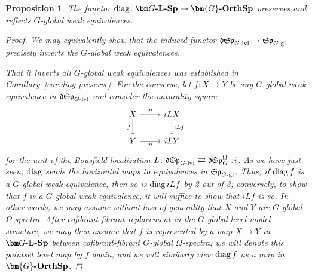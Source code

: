 \documentclass[reqno]{memo-l}
\theoremstyle{mythm}
\newtheorem{prop}[thm]{Proposition}
\theoremstyle{definition}
\numberwithin{equation}{section}
\newcommand{\cat}[1]{\textbf{\textup{#1}}}
\newcommand{\diag}{\textup{diag}}
\newcommand\noloc{%
	\nobreak
	\mspace{6mu plus 1mu}
	{:}
	\nonscript\mkern-\thinmuskip
	\mathpunct{}
	\mspace{2mu}
}
\newcommand{\mySp}{{\mathfrak S\kern-.5pt\mathfrak p}}
\newcommand{\myLSp}{{\mathfrak d\kern-.25pt}\mySp}
\newcommand{\Gosp}[1]{\cat{$\bm{#1}$-OrthSp}}
\begin{document}
\begin{prop}\label{prop:he-preserve-but-he-also-reflec}
    The functor $\diag\colon\cat{$\bm G$-$\cat{L}$-Sp}\to\Gosp{G}$ preserves and reflects $G$-global weak equivalences.
    \begin{proof}
        We may equivalently show that the induced functor $\myLSp_\text{$G$-lvl}\to\mySp_\text{$G$-gl}$ precisely inverts the $G$-global weak equivalences.
       
        That it inverts all $G$-global weak equivalences was established in Corollary~\ref{cor:diag-preserve}. For the converse, let $f\colon X\to Y$ be any $G$-global weak equivalence in $\myLSp_\text{$G$-lvl}$ and consider the naturality square
        \[
            \begin{tikzcd}
                X\arrow[d,"f"']\arrow[r,"\eta"] & iLX\arrow[d,"iLf"]\\
                Y\arrow[r,"\eta"'] & iLY
            \end{tikzcd}
        \]
        for the unit of the Bousfield localization $L\colon\myLSp_\text{$G$-lvl}\rightleftarrows\myLSp_\text{$G$}^\Omega\noloc i$. As we have just seen, $\diag$ sends the horizontal maps to equivalences in $\mySp_\text{$G$-gl}$. Thus, if $\diag\,f$ is a $G$-global weak equivalence, then so is $\diag\,iLf$ by 2-out-of-3; conversely, to show that $f$ is a $G$-global weak equivalence, it will suffice to show that $iLf$ is so. In other words, we may assume without loss of generality that $X$ and $Y$ are $G$-global $\Omega$-spectra. After cofibrant-fibrant replacement in the $G$-global level model structure, we may then assume that $f$ is represented by a map $X\to Y$ in $\cat{$\bm G$-$\cat{L}$-Sp}$ between cofibrant-fibrant $G$-global $\Omega$-spectra; we will denote this pointset level map by $f$ again, and we will similarly view $\diag\,f$ as a map in $\Gosp{G}$.


\end{proof}
\end{prop}
\end{document}
